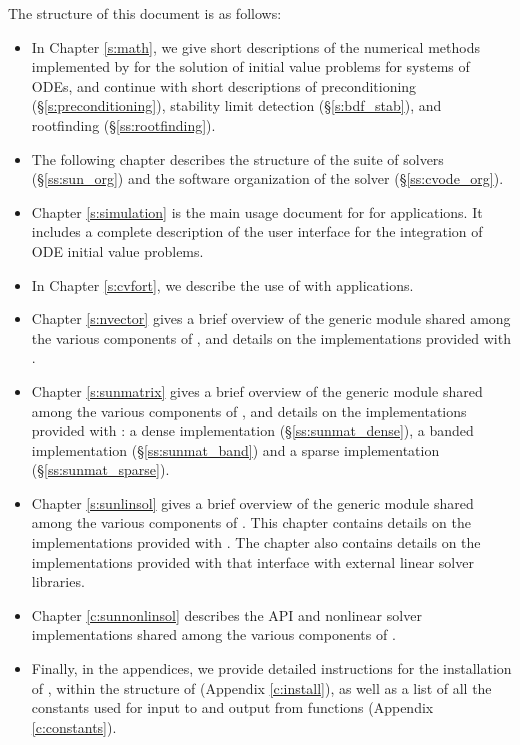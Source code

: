 The structure of this document is as follows:
\begin{itemize}
\item
  In Chapter \ref{s:math}, we give short descriptions of the numerical
  methods implemented by {\cvode} for the solution of initial value
  problems for systems of ODEs, and continue with short descriptions of
  preconditioning (\S\ref{s:preconditioning}), stability limit detection
  (\S\ref{s:bdf_stab}), and rootfinding (\S\ref{ss:rootfinding}).
\item
  The following chapter describes the structure of the {\sundials} suite
  of solvers (\S\ref{ss:sun_org}) and the software organization of the {\cvode}
  solver (\S\ref{ss:cvode_org}).
\item
  Chapter \ref{s:simulation} is the main usage document for {\cvode} for
  {\CC} applications.  It includes a complete description of the user interface
  for the integration of ODE initial value problems.
\item
  In Chapter \ref{s:cvfort}, we describe the use of {\cvode} with {\F} applications.
\item
  Chapter \ref{s:nvector} gives a brief overview of the generic
  {\nvector} module shared among the various components of
  {\sundials}, and details on the {\nvector} implementations
  provided with {\sundials}.
\item
  Chapter \ref{s:sunmatrix} gives a brief overview of the generic
  {\sunmatrix} module shared among the various components of
  {\sundials}, and details on the {\sunmatrix} implementations
  provided with {\sundials}:
  a dense implementation (\S\ref{ss:sunmat_dense}),
  a banded implementation (\S\ref{ss:sunmat_band}) and
  a sparse implementation (\S\ref{ss:sunmat_sparse}).
\item
  Chapter \ref{s:sunlinsol} gives a brief overview of the generic
  {\sunlinsol} module shared among the various components of
  {\sundials}.  This chapter contains details on the {\sunlinsol}
  implementations provided with {\sundials}.
  The chapter
  also contains details on the {\sunlinsol} implementations provided
  with {\sundials} that interface with external linear solver
  libraries.
\item
  Chapter \ref{c:sunnonlinsol} describes the {\sunnonlinsol} API and nonlinear
  solver implementations shared among the various components of {\sundials}.
\item
  Finally, in the appendices, we provide detailed instructions for the installation
  of {\cvode}, within the structure of {\sundials} (Appendix \ref{c:install}), as well
  as a list of all the constants used for input to and output from {\cvode} functions
  (Appendix \ref{c:constants}).
\end{itemize}

